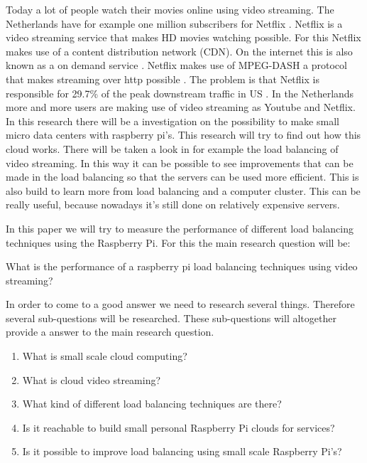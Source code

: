 \documentclass{sig-alternate-br}
\begin{document}
Today a lot of people watch their movies online using video streaming. 
The Netherlands have for example one million subscribers for Netflix \cite{volkskrant}. Netflix is a video streaming service that makes HD movies watching possible. For this Netflix makes use of a content distribution network (CDN). On the internet this is also known as a on demand service \cite{Adhikari:2012}. Netflix makes use of MPEG-DASH a protocol that makes streaming over http possible \cite{martin:2013}. The problem is that Netflix is responsible for  29.7\% of the peak downstream traffic in US  \cite{Adhikari:2012}. In the Netherlands more and more users are making use of video streaming as Youtube and Netflix. In this research there will be a investigation on the possibility to make small micro data centers with raspberry pi's. This research will try to find out how this cloud works. There will be taken a look in for example the load balancing of video streaming. In this way it can be possible to see improvements that can be made in the load balancing so that the servers can be used more efficient. This is also build to learn more from load balancing and a computer cluster. This can be really useful, because nowadays it's still done on relatively expensive servers. 

In this paper we will try to measure the performance of different load balancing techniques using the Raspberry Pi. For this the main research question will be: 
\begin{center}
 What is the performance of a raspberry pi load balancing techniques using video streaming?
\end{center}

In order to come to a good answer we need to  research several things. Therefore several sub-questions will be researched. These sub-questions will altogether provide a answer to the main research question. 

\begin{enumerate}
	\item What is small scale cloud computing?
	\item What is cloud video streaming?
	\item What kind of different load balancing techniques are there?
	\item Is it reachable to build small personal Raspberry Pi clouds for services?
	\item Is it possible to improve load balancing using small scale Raspberry Pi's? 
\end{enumerate}
\end{document}
